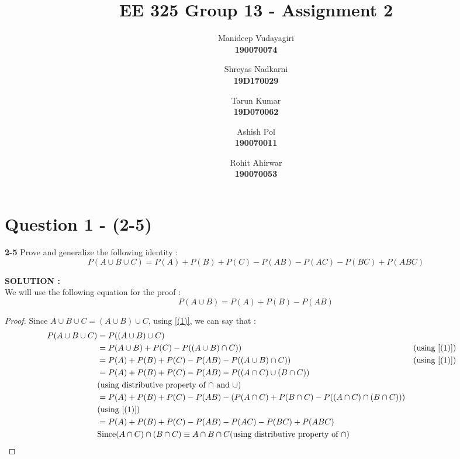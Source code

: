 \documentclass{article}
\begin{document}
\title{EE 325 Group 13 - Assignment 2 }
\author{
	Manideep Vudayagiri\\
	\textbf{190070074}
	\and
	Shreyas Nadkarni\\
	\textbf{19D170029}
	\and
	Tarun Kumar\\
	\textbf{19D070062}
	\and
	Ashish Pol\\
	\textbf{190070011}
	\and
	Rohit Ahirwar\\
	\textbf{190070053}
	
	
}

\maketitle
\tableofcontents
\thispagestyle{empty}
\clearpage
{}

\newpage

\section{Question 1 - (2-5)}
\label{Q1}
\textbf{2-5} Prove and generalize the following identity : \\
\begin{equation*}
	P(A \cup B \cup C) = P(A) + P(B) + P(C) - P(AB) - P(AC) - P(BC) + P(ABC)
\end{equation*}

\hspace{1em} \large{\textbf{SOLUTION :}} \\
We will use the following equation for the proof :
\begin{equation}
\label{(1)}
	P(A \cup B ) = P(A) + P(B) - P(AB)
\end{equation}
\begin{proof}
	Since $A \cup B \cup C = (A \cup B) \cup C$,  using \ref{(1)}, we can say that : \\ 
	\begin{align*}
		    P(A \cup B \cup C) &=P((A \cup B) \cup C) \\
		    &= P(A \cup B) + P(C) - P((A \cup B) \cap C)) &&\text{(using \ref{(1)})} \\
		    &= P(A) + P(B) + P(C) - P(AB) - P((A \cup B) \cap C)) &&\text{(using \ref{(1)})} \\
		    &= P(A) + P(B) + P(C) - P(AB) - P((A \cap C) \cup (B \cap C)) \\ &\text{(using distributive property of $\cap$ and $\cup$)} \\
		    &= P(A) + P(B) + P(C) - P(AB) - \left(P(A \cap C) + P(B \cap C) - P((A \cap C) \cap (B \cap C)) \right) \\ &\text{(using \ref{(1)})} \\
		    &= P(A) + P(B) + P(C) - P(AB) - P(AC) - P(BC) + P(ABC) \\
		    & \text{Since}  (A \cap C) \cap (B \cap C) \equiv A \cap B \cap C  \text{(using distributive property of $\cap$)} 	
	 \end{align*}
\end{proof}
\end{document}
